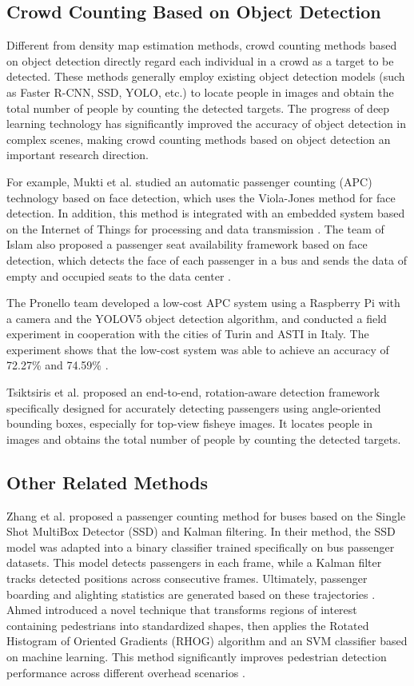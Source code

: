 \subsection{Crowd Counting Based on Object Detection}
Different from density map estimation methods, crowd counting methods based on object detection directly regard each individual in a crowd as a target to be detected. These methods generally employ existing object detection models (such as Faster R-CNN, SSD, YOLO, etc.) to locate people in images and obtain the total number of people by counting the detected targets. The progress of deep learning technology has significantly improved the accuracy of object detection in complex scenes, making crowd counting methods based on object detection an important research direction.

For example, Mukti et al. studied an automatic passenger counting (APC) technology based on face detection, which uses the Viola-Jones method for face detection. In addition, this method is integrated with an embedded system based on the Internet of Things for processing and data transmission \cite{43_mukti_pemodelan_2021}. The team of Islam also proposed a passenger seat availability framework based on face detection, which detects the face of each passenger in a bus and sends the data of empty and occupied seats to the data center \cite{24_islam_framework_2020}.

The Pronello team developed a low-cost APC system using a Raspberry Pi with a camera and the YOLOV5 object detection algorithm, and conducted a field experiment in cooperation with the cities of Turin and ASTI in Italy. The experiment shows that the low-cost system was able to achieve an accuracy of 72.27\% and 74.59\% \cite{49_pronello_evaluating_2023}.

Tsiktsiris et al. proposed an end-to-end, rotation-aware detection framework specifically designed for accurately detecting passengers using angle-oriented bounding boxes, especially for top-view fisheye images. It locates people in images and obtains the total number of people by counting the detected targets\cite{55_tsiktsiris_improving_2024}.


\subsection{Other Related Methods}
Zhang et al. proposed a passenger counting method for buses based on the Single Shot MultiBox Detector (SSD) and Kalman filtering. In their method, the SSD model was adapted into a binary classifier trained specifically on bus passenger datasets. This model detects passengers in each frame, while a Kalman filter tracks detected positions across consecutive frames. Ultimately, passenger boarding and alighting statistics are generated based on these trajectories \cite{66_zhang_bus_2020}. Ahmed introduced a novel technique that transforms regions of interest containing pedestrians into standardized shapes, then applies the Rotated Histogram of Oriented Gradients (RHOG) algorithm and an SVM classifier based on machine learning. This method significantly improves pedestrian detection performance across different overhead scenarios \cite{05_ahmed_person_2019}.

